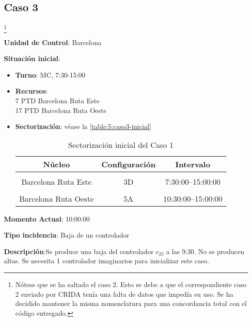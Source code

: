 \subsection{Caso 3}\footnote{Nótese que se ha saltado el caso 2. Esto se debe a que el correspondiente caso 2 enviado por \gls{CRIDA} tenía una falta de datos que impedía su uso. Se ha decidido mantener la misma nomenclatura para una concordancia total con el código entregado.}

\textbf{Unidad de Control}: Barcelona

\textbf{Situación inicial}:
\begin{itemize}[label={}]
	
	\item \textbf{Turno}: MC, 7:30-15:00
	
	\item \textbf{Recursos}: \\
	7 PTD Barcelona Ruta Este \\
	17 PTD Barcelona Ruta Oeste
	
	
	\item \textbf{Sectorización}: véase la \autoref{table:5:caso3-inicial}
	\begin{table}[h]
		\centering
		\caption{Sectorización inicial del Caso 1}
		\begin{tabular}{ccc}
			\hline
			\textbf{Núcleo}      & \textbf{Configuración} & \textbf{Intervalo}   \\ \hline
			\multicolumn{1}{l}{} & \multicolumn{1}{l}{}   & \multicolumn{1}{l}{} \\
			Barcelona Ruta Este  & 3D                     & 7:30:00--15:00:00    \\
			\multicolumn{1}{l}{} & \multicolumn{1}{l}{}   & \multicolumn{1}{l}{} \\
			Barcelona Ruta Oeste & 5A                     & 10:30:00--15:00:00   \\ \hline
		\end{tabular}
		\label{table:5:caso3-inicial}
	\end{table}
	
	
\end{itemize}

\textbf{Momento Actual}: 10:00:00

\textbf{Tipo incidencia}: Baja de un controlador

\textbf{Descripción}:Se produce una baja del controlador $c_{23}$ a las 9:30. No se producen altas. Se necesita 1 controlador imaginarios para inicializar este caso.

